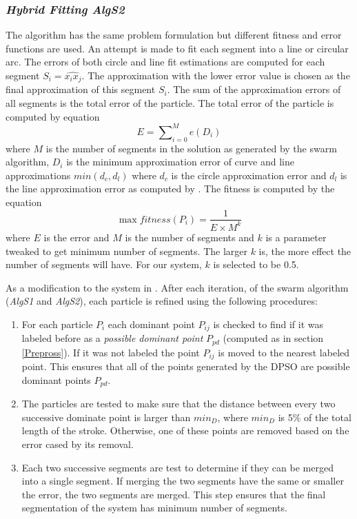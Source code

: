 \documentclass[10pt]{article}
\begin{document}
 \subsubsection{\textit{Hybrid Fitting \textsl{AlgS2}}}
The algorithm has the same problem formulation but different fitness and error functions are used. An attempt is made to fit each segment into a line or circular arc. The errors of both circle and line fit estimations are computed for each segment $S_i=\widehat{x_ix_j}$. The approximation with the lower error value is chosen as the final approximation of this segment $S_i$\cite{CruveDivisionSwarm}. The sum of the approximation errors of all segments is the total error of the particle.  The total error of the particle is computed by equation %
 \begin{equation}
E=\sum\nolimits_{i = 0}^M e(D_i) 
\label{eq:errorSwarm2}
\end{equation}where $M$ is the number of segments in the solution as generated by the swarm algorithm, $D_i$ is the minimum approximation error of curve and line approximations $min(d_c,d_l)$ where $d_c$ is the circle approximation error and $d_l$ is the line approximation error as computed by \cite{CruveDivisionSwarm}.  The fitness is computed by the equation %
\begin{equation}
\max fitness(P_i ) = \frac{1}{{E \times M^k }}
\label{eq:fitnessSwarm2}
\end{equation} where $E$ is the error and $M$ is the number of segments and $k$ is a parameter tweaked to get minimum number of segments. The larger $k$ is, the more effect the number of segments will have. For our system, $k$ is selected to be 0.5\cite{CruveDivisionSwarm}.

As a modification to the system in \cite{mypaper}. After each iteration, of the swarm algorithm (\textsl{AlgS1} and \textsl{AlgS2}), each particle is refined using the following procedures: 
\begin{enumerate}
	\item For each particle $P_i$ each dominant point $P_{ij}$ is checked to find if it was labeled before as a \textit{possible dominant point} $P_{pd}$ (computed as in section \ref{Prepross}). If it was not labeled the point $P_{ij}$ is moved to the nearest labeled point. This ensures that all of the points generated by the DPSO are possible dominant points $P_{pd}$. 
	\item The particles are tested to make sure that the distance between every two successive dominate point is larger than $min_D$, where $min_D$ is 5\% of the total length of the stroke.  Otherwise, one of these points are removed based on the error cased by its removal.
	\item Each two successive segments are test to determine if they can be merged into a single segment. If merging the two segments have the same or smaller the error, the two segments are merged. This step ensures that the final segmentation of the system has minimum number of segments. 
\end{enumerate}
\end{document}
